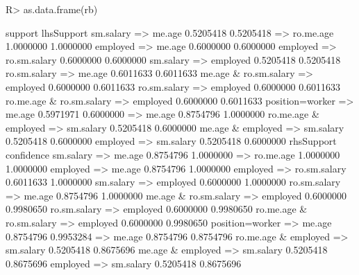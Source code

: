 \begin{Schunk}
% --begin: "searchrules3"
\begin{Sinput}
R> as.data.frame(rb)
\end{Sinput}
\begin{Soutput}
                                       support lhsSupport
sm.salary => me.age                  0.5205418  0.5205418
 => ro.me.age                        1.0000000  1.0000000
employed => me.age                   0.6000000  0.6000000
employed => ro.sm.salary             0.6000000  0.6000000
sm.salary => employed                0.5205418  0.5205418
ro.sm.salary => me.age               0.6011633  0.6011633
me.age & ro.sm.salary => employed    0.6000000  0.6011633
ro.sm.salary => employed             0.6000000  0.6011633
ro.me.age & ro.sm.salary => employed 0.6000000  0.6011633
position=worker => me.age            0.5971971  0.6000000
 => me.age                           0.8754796  1.0000000
ro.me.age & employed => sm.salary    0.5205418  0.6000000
me.age & employed => sm.salary       0.5205418  0.6000000
employed => sm.salary                0.5205418  0.6000000
                                     rhsSupport confidence
sm.salary => me.age                   0.8754796  1.0000000
 => ro.me.age                         1.0000000  1.0000000
employed => me.age                    0.8754796  1.0000000
employed => ro.sm.salary              0.6011633  1.0000000
sm.salary => employed                 0.6000000  1.0000000
ro.sm.salary => me.age                0.8754796  1.0000000
me.age & ro.sm.salary => employed     0.6000000  0.9980650
ro.sm.salary => employed              0.6000000  0.9980650
ro.me.age & ro.sm.salary => employed  0.6000000  0.9980650
position=worker => me.age             0.8754796  0.9953284
 => me.age                            0.8754796  0.8754796
ro.me.age & employed => sm.salary     0.5205418  0.8675696
me.age & employed => sm.salary        0.5205418  0.8675696
employed => sm.salary                 0.5205418  0.8675696
\end{Soutput}
%
% --end: "searchrules3"
\end{Schunk}
